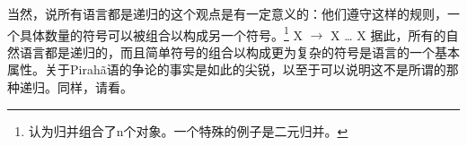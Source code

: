 	
当然，说所有语言都是递归的这个观点是有一定意义的：他们遵守这样的规则，一个具体数量的符号可以被组合以构成另一个符号。\footnote{
\citet[]{Chomsky2005a}认为归并组合了n个对象。一个特殊的例子是二元归并。
}
\ea
X $\to$ X \ldots{} X
\z
据此，所有的自然语言都是递归的，而且简单符号的组合以构成更为复杂的符号是语言的一个基本属性\citep[]{Hockett60a}。关于Pirah{\~a}语的争论的事实是如此的尖锐，以至于可以说明这不是所谓的那种递归。同样，请看\citet{Fitch2010a}。

